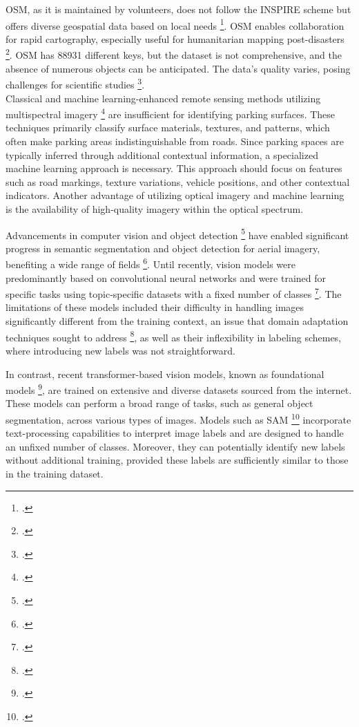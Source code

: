 \begin{refsection}
OSM, as it is maintained by volunteers, does not follow the INSPIRE scheme but offers diverse geospatial data based on local needs \footcite{minghini_comparing_2019}. OSM enables collaboration for rapid cartography, especially useful for humanitarian mapping post-disasters \footcite{herfort_evolution_2021}. OSM has 88931 
different keys, but the dataset is not comprehensive, and the absence 
of numerous objects can be anticipated. The data's quality varies, posing challenges for scientific studies \footcite{minghini_openstreetmap_2019, haklay_how_2010}. \\


Classical and machine learning-enhanced remote sensing methods utilizing multispectral imagery \footcite{sharifi_application_2020,sharifi_nitrogen_2022,nejad_multispectral_2023,esmaeili_hyperspectral_2023,jalayer_assessment_2023} are insufficient for identifying parking surfaces. These techniques primarily classify surface materials, textures, and patterns, which often make parking areas indistinguishable from roads. Since parking spaces are typically inferred through additional contextual information, a specialized machine learning approach is necessary. This approach should focus on features such as road markings, texture variations, vehicle positions, and other contextual indicators. Another advantage of utilizing optical imagery and machine learning is the availability of high-quality imagery within the optical spectrum. 


Advancements in computer vision and object detection \footcite{zou_object_2023} have enabled significant progress in semantic segmentation and object detection for aerial imagery, benefiting a wide range of fields \footcite{yuan_review_2021}. Until recently, vision models were predominantly based on convolutional neural networks and were trained for specific tasks using topic-specific datasets with a fixed number of classes \footcite{thisanke_semantic_2023, mauricio_comparing_2023}. The limitations of these models included their difficulty in handling images significantly different from the training context, an issue that domain adaptation techniques sought to address \footcite{singhal_domain_2023}, as well as their inflexibility in labeling schemes, where introducing new labels was not straightforward.


In contrast, recent transformer-based vision models, known as foundational models \footcite{awais_foundational_2023}, are trained on extensive and diverse datasets sourced from the internet. These models can perform a broad range of tasks, such as general object segmentation, across various types of images. Models such as SAM \footcite{kirillov_segment_2023} incorporate text-processing capabilities to interpret image labels and are designed to handle an unfixed number of classes. Moreover, they can potentially identify new labels without additional training, provided these labels are sufficiently similar to those in the training dataset.



\end{refsection}
